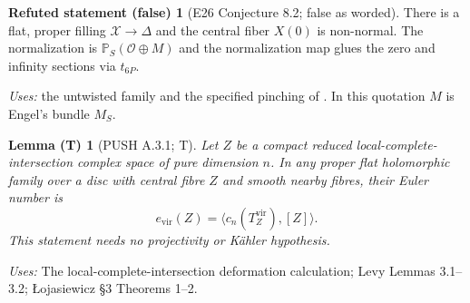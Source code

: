 \documentclass[11pt,a4paper]{article}
\theoremstyle{plain}
\newtheorem{lemma}[theorem]{Lemma (T)}
\theoremstyle{definition}
\newtheorem{refuted}[theorem]{Refuted statement (false)}
\begin{document}
\begin{refuted}[E26 Conjecture 8.2; false as worded]\label{e26:Conjecture8.2}
There is a flat, proper filling $\mathcal X\to \Delta$ and the central fiber $X(0)$ is non-normal. The normalization
is $\mathbb P_S(\mathcal O\oplus M)$ and the normalization map glues the zero and infinity sections via $t_{6P}$.
\end{refuted}
\noindent\emph{Uses:} the untwisted family and the specified pinching of \cite[Conjecture~8.2]{E26}. In this quotation $M$ is Engel's bundle $M_S$.\par
\begin{lemma}[PUSH A.3.1; T]\label{push:A.3.1}
Let $Z$ be a compact reduced local-complete-intersection complex
space of pure dimension $n$. In any proper flat holomorphic
family over a disc with central fibre $Z$ and smooth nearby
fibres, their Euler number is
\[
 e_{\mathrm{vir}}(Z)=\langle c_n(T_Z^{\mathrm{vir}}),[Z]\rangle.
\]
This statement needs no projectivity or K\"ahler hypothesis.
\end{lemma}
\noindent\emph{Uses:} The local-complete-intersection deformation calculation; Levy Lemmas 3.1--3.2; \L{}ojasiewicz \S3 Theorems 1--2.\par
\end{document}
